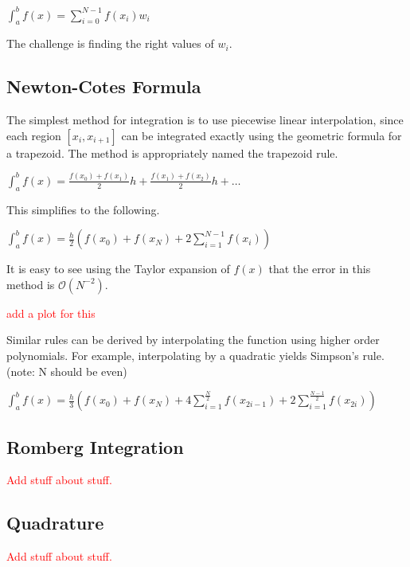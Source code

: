 \documentclass[12pt,letterpaper]{article}
\numberwithin{equation}{section}
\begin{document}
\begin{center}
$\int_{a}^{b}f(x) = \sum_{i=0}^{N-1}f(x_i)w_i$
\end{center}

The challenge is finding the right values of $w_i$.

\subsection{Newton-Cotes Formula}
The simplest method for integration is to use piecewise linear interpolation, since each region $[x_i,x_{i+1}]$ can be integrated exactly using the geometric formula for a trapezoid. The method is appropriately named the trapezoid rule.

\begin{center}
$\int_{a}^{b}f(x) = \frac{f(x_0)+f(x_1)}{2}h + \frac{f(x_1)+f(x_2)}{2}h + \dots$
\end{center}

\noindent This simplifies to the following.

\begin{center}
$\int_{a}^{b}f(x) = \frac{h}{2}(f(x_0)+f(x_N) + 2\sum_{i=1}^{N-1}f(x_i))$
\end{center}

It is easy to see using the Taylor expansion of $f(x)$ that the error in this method is $\mathcal{O}(N^{-2})$.

\begin{center}
\textcolor{red}{add a plot for this}
\end{center}

Similar rules can be derived by interpolating the function using higher order polynomials. For example, interpolating by a quadratic yields Simpson's rule. (note: N should be even)

\begin{center}
$\int_{a}^{b}f(x) = \frac{h}{3}(f(x_0)+f(x_N) + 4\sum_{i=1}^{\frac{N}{2}}f(x_{2i-1}) + 2\sum_{i=1}^{\frac{N - 1}{2}}f(x_{2i}))$
\end{center}

\subsection{Romberg Integration}
\begin{center}
\textcolor{red}{Add stuff about stuff.}
\end{center}

\subsection{Quadrature}
\begin{center}
\textcolor{red}{Add stuff about stuff.}
\end{center}
\end{document}
